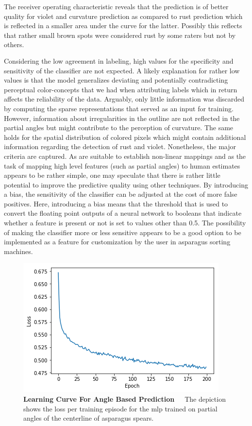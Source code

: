 The receiver operating characteristic reveals that the prediction is of better quality for violet and curvature prediction as compared to rust prediction which is reflected in a smaller area under the curve for the latter. Possibly this reflects that rather small brown spots were considered rust by some raters but not by others. 

Considering the low agreement in labeling, high values for the specificity and sensitivity of the classifier are not expected. A likely explanation for rather low values is that the model generalizes deviating and potentially contradicting perceptual color-concepts that we had when attributing labels which in return affects the reliability of the data. Arguably, only little information was discarded by computing the sparse representations that served as an input for training. However, information about irregularities in the outline are not reflected in the partial angles but might contribute to the perception of curvature. The same holds for the spatial distribution of colored pixels which might contain additional information regarding the detection of rust and violet. Nonetheless, the major criteria are captured. As  are suitable to establish non-linear mappings and as the task of mapping high level features (such as partial angles) to human estimates appears to be rather simple, one may speculate that there is rather little potential to improve the predictive quality using other techniques. By introducing a bias, the sensitivity of the classifier can be adjusted at the cost of more false positives. Here, introducing a bias means that the threshold that is used to convert the floating point outputs of a neural network to booleans that indicate whether a feature is present or not is set to values other than 0.5. The possibility of making the classifier more or less sensitive appears to be a good option to be implemented as a feature for customization by the user in asparagus sorting machines.

\begin{figure}[!hb]
	\centering
	\includegraphics[scale=0.7]{Figures/chapter04/fe_curve.png}
	\decoRule
	\caption[Feature Engineering Learning Curve For Angle Based Prediction]{\textbf{Learning Curve For Angle Based Prediction}~~~The depiction shows the loss per training episode for the \acrshort{mlp} trained on partial angles of the centerline of asparagus spears.}
	\label{fig:FeatureEngineeringCurve}
\end{figure}


